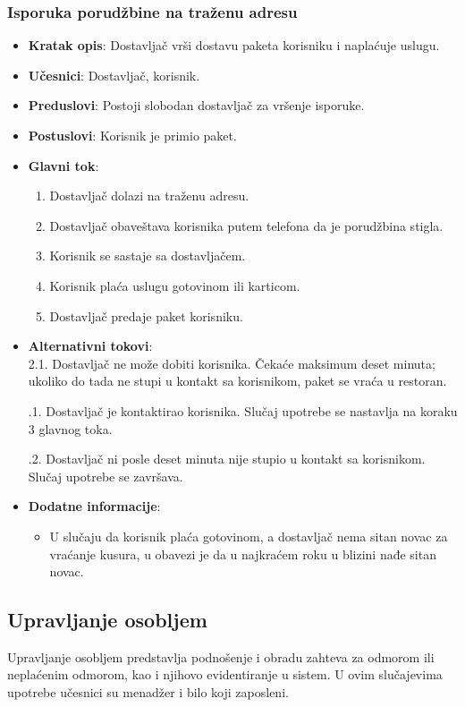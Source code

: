  \subsubsection{Isporuka porudžbine na traženu adresu}
 \begin{itemize}
    \item \textbf{Kratak opis}: Dostavljač vrši dostavu paketa korisniku i naplaćuje uslugu.
    \item \textbf{Učesnici}:
    Dostavljač, korisnik.
    \item \textbf{Preduslovi}:
    Postoji slobodan dostavljač za vršenje isporuke.
    \item \textbf{Postuslovi}:
    Korisnik je primio paket.
    \item \textbf{Glavni tok}:
    \begin{enumerate}
        \item Dostavljač dolazi na traženu adresu.
        \item Dostavljač obaveštava korisnika putem telefona da je porudžbina stigla.
        \item Korisnik se sastaje sa dostavljačem.
        \item Korisnik plaća uslugu gotovinom ili karticom.
        \item Dostavljač predaje paket korisniku.
 \end{enumerate}
    \item \textbf{Alternativni tokovi}:\\
        2.1. Dostavljač ne može dobiti korisnika. Čekaće maksimum deset minuta; ukoliko do tada ne stupi u kontakt sa korisnikom, paket se vraća u restoran. 
        
        .1. Dostavljač je kontaktirao korisnika. Slučaj upotrebe se nastavlja na koraku 3 glavnog toka.
        
        .2. Dostavljač ni posle deset minuta nije stupio u kontakt sa korisnikom. Slučaj upotrebe se završava.
        
    \item \textbf{Dodatne informacije}:
     \begin{itemize}
     \item U slučaju da korisnik plaća gotovinom, a dostavljač nema sitan novac za vraćanje kusura, u obavezi je da u najkraćem roku u blizini nađe sitan novac.
 \end{itemize}
 \end{itemize}
 \subsection{Upravljanje osobljem}
 Upravljanje osobljem predstavlja podno\v senje i obradu zahteva za odmorom ili nepla\'cenim odmorom, kao i njihovo evidentiranje u sistem. U ovim slu\v cajevima upotrebe u\v cesnici su menad\v zer i bilo koji zaposleni.
 
